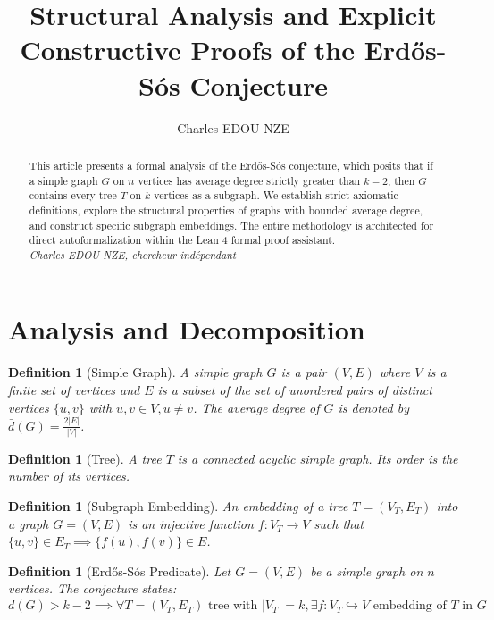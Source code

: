 \documentclass[11pt,a4paper]{article}
\title{Structural Analysis and Explicit Constructive Proofs of the Erd\H{o}s-S\'os Conjecture}
\author{Charles EDOU NZE}
\date{}
\newtheorem{definition}[theorem]{Definition}
\begin{document}
\maketitle

\begin{abstract}
This article presents a formal analysis of the Erd\H{o}s-S\'os conjecture, which posits that if a simple graph $G$ on $n$ vertices has average degree strictly greater than $k-2$, then $G$ contains every tree $T$ on $k$ vertices as a subgraph. We establish strict axiomatic definitions, explore the structural properties of graphs with bounded average degree, and construct specific subgraph embeddings. The entire methodology is architected for direct autoformalization within the Lean 4 formal proof assistant.
\vspace{0.5cm}\\
\noindent \textit{Charles EDOU NZE, chercheur ind\'ependant}
\end{abstract}

\tableofcontents

\section{Analysis and Decomposition}

\begin{definition}[Simple Graph]
A simple graph $G$ is a pair $(V, E)$ where $V$ is a finite set of vertices and $E$ is a subset of the set of unordered pairs of distinct vertices $\{u, v\}$ with $u, v \in V, u \neq v$. The average degree of $G$ is denoted by $\bar{d}(G) = \frac{2|E|}{|V|}$.
\end{definition}

\begin{definition}[Tree]
A tree $T$ is a connected acyclic simple graph. Its order is the number of its vertices.
\end{definition}

\begin{definition}[Subgraph Embedding]
An embedding of a tree $T = (V_T, E_T)$ into a graph $G = (V, E)$ is an injective function $f : V_T \to V$ such that $\{u, v\} \in E_T \implies \{f(u), f(v)\} \in E$.
\end{definition}

\begin{definition}[Erd\H{o}s-S\'os Predicate]
Let $G = (V, E)$ be a simple graph on $n$ vertices. The conjecture states:
$$ \bar{d}(G) > k - 2 \implies \forall T = (V_T, E_T) \text{ tree with } |V_T| = k, \exists f : V_T \hookrightarrow V \text{ embedding of } T \text{ in } G $$
\end{definition}
\end{document}
